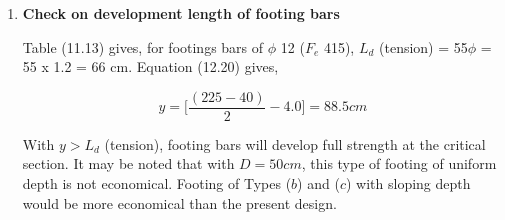 \documentclass{report}
\begin{document}
\begin{enumerate}
Table 19 of the Code gives,
$$\sage{tau_c}=0.32N/mm^2$$
$$K = 1.0$$
        $$\sage{tau_a}=\sage{tau_c}=0.032kN/cm^2$$
$$\sage{tau_v}=\sage{tau_a}, D = 50cm \text{ is safe}$$

\item  \textbf{Check on development length of footing bars}

Table (11.13) gives, for footings bars of $\phi$ 12 ($F_e$ 415),
$L_d$ (tension) = 55$\phi$ = 55 x 1.2 = 66 cm.
Equation (12.20) gives, 

$$y=\bigg[\frac{(225-40)}{2}-4.0\bigg]=88.5cm$$

With $y > L_d$ (tension), footing bars will develop full strength at the critical section. 
It may be noted that with $D = 50 cm$, this type of footing of uniform depth is not economical. 
Footing of Types ($b$) and ($c$) with sloping depth would be more economical than the present design.
\end{enumerate} 

\end{document}
